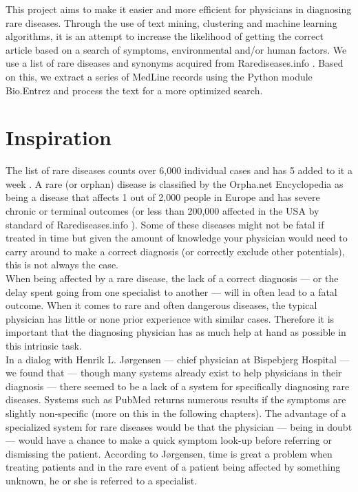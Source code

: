 This project aims to make it easier and more efficient for physicians
in diagnosing rare diseases. Through the use of text mining,
clustering and machine learning algorithms, it is an attempt to
increase the likelihood of getting the correct article based on a
search of symptoms, environmental and/or human factors. We use a list
of rare diseases and synonyms acquired from Rarediseases.info
\cite{Rarediseases}. Based on this, we
extract a series of MedLine records \cite{PubMedFactSheetMedline}
using the Python module Bio.Entrez \cite{EntrezProgUtil} and process
the text for a more optimized search.

\section{Inspiration}

The list of rare diseases counts over 6,000 individual cases and has 5
added to it a week \cite{AboutRareDiseasesOrphanet}. A rare (or
orphan) disease is classified by the Orpha.net Encyclopedia
\cite{OrphanetEncyclopedia} as being a disease that affects 1 out of 2,000
people in Europe and has severe chronic or terminal outcomes (or less
than 200,000 affected in the USA by standard of
Rarediseases.info \cite{Rarediseases}). Some
of these diseases might not be fatal if treated in time but given the
amount of knowledge your physician would need to carry around to make
a correct diagnosis (or correctly exclude other potentials), this is
not always the case.\\

When being affected by a rare disease, the lack of a correct diagnosis
--- or the delay spent going from one specialist to another --- will in
often lead to a fatal outcome. When it comes to rare and often
dangerous diseases, the typical physician has little or none prior
experience with similar cases. Therefore it is important that the
diagnosing physician has as much help at hand as possible in this
intrinsic task.\\

In a dialog with Henrik L. J\o rgensen \cite{TheDude} --- chief physician
at Bispebjerg Hospital --- we found that --- though many systems already exist
to help physicians in their diagnosis --- there seemed to be a lack of a
system for specifically diagnosing rare diseases. Systems such as
PubMed returns numerous results if the symptoms are slightly
non-specific (more on this in the following chapters). The advantage
of a specialized system for rare diseases would be that the physician ---
being in doubt --- would have a chance to make a quick symptom look-up
before referring or dismissing the patient. According to Jørgensen,
time is great a problem when treating patients and in the rare event
of a patient being affected by something unknown, he or she is referred
to a specialist.\\

